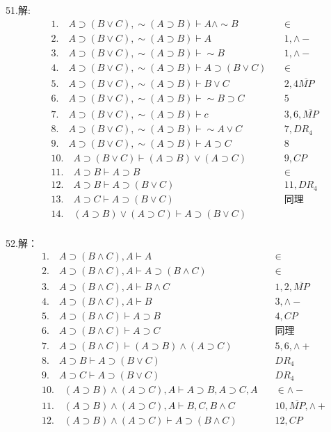 \documentclass[a4paper]{ctexart}
\begin{document}
\noindent 51.解:
\begin{align*}
  &1. \quad A\supset(B\vee C),\sim(A\supset B)\vdash A\wedge\sim B \quad&\in \\
  &2. \quad A\supset(B\vee C),\sim(A\supset B)\vdash A \quad&1,\wedge-  \\
  &3. \quad A\supset(B\vee C),\sim(A\supset B)\vdash \sim B \quad&1,\wedge- \\
  &4. \quad A\supset(B\vee C),\sim(A\supset B)\vdash A\supset(B\vee C) \quad&\in \\
  &5. \quad A\supset(B\vee C),\sim(A\supset B)\vdash B\vee C \quad& 2,4\overline{MP}\\
  &6. \quad A\supset(B\vee C),\sim(A\supset B)\vdash \sim B\supset C  \quad&5 \\
  &7. \quad A\supset(B\vee C),\sim(A\supset B)\vdash c\quad&3,6,\overline{MP} \\
  &8. \quad A\supset(B\vee C),\sim(A\supset B)\vdash \sim A\vee C \quad&7,DR_4 \\
  &9. \quad  A\supset(B\vee C),\sim(A\supset B)\vdash A\supset C \quad& 8\\
  &10. \quad A\supset(B\vee C)\vdash (A\supset B)\vee(A\supset C)\quad&9,CP \\
  &11. \quad A\supset B\vdash A\supset B\quad& \in\\
  &12. \quad A\supset B\vdash A\supset(B\vee C) \quad&11,DR_4 \\
  &13. \quad A\supset C\vdash A\supset(B\vee C) \quad&\text{同理} \\
  &14. \quad (A\supset B)\vee(A\supset C)\vdash A\supset(B\vee C) \quad& \\
\end{align*}

\noindent 52.解：
\begin{align*}
  &1. \quad A\supset(B\wedge C),A \vdash A &\quad\in \\
  &2. \quad A\supset(B\wedge C),A \vdash A\supset(B\wedge C) &\quad\in \\
  &3. \quad A\supset(B\wedge C),A \vdash B\wedge C&\quad 1,2,\overline{MP} \\
  &4. \quad A\supset(B\wedge C),A \vdash B &\quad 3,\wedge-\\
  &5. \quad A\supset(B\wedge C) \vdash A\supset B &\quad 4,CP \\
  &6. \quad A\supset(B\wedge C) \vdash A\supset C &\quad \text{同理} \\
  &7. \quad A\supset(B\wedge C) \vdash (A\supset B)\wedge(A\supset C) &\quad 5,6,\wedge+ \\
  &8. \quad A\supset B \vdash A\supset(B\vee C) &\quad DR_4 \\
  &9. \quad A\supset C \vdash A\supset(B\vee C) &\quad DR_4 \\
  &10. \quad (A\supset B)\wedge(A\supset C),A\vdash A\supset B,A\supset C, A &\quad \in \wedge- \\
  &11. \quad (A\supset B)\wedge(A\supset C),A\vdash B,C,B\wedge C &\quad 10,\overline{MP},\wedge+ \\
  &12. \quad (A\supset B)\wedge(A\supset C) \vdash A\supset(B\wedge C) &\quad 12,CP \\
\end{align*}
\end{document}
